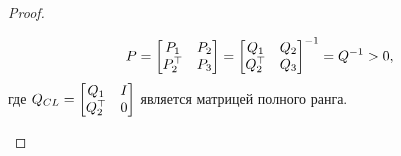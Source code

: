 \begin{proof}
\begin{lemma}
		\begin{align*}
			{P}=
			\begin{bmatrix} 
				{P}_{1} & {P}_{2}\\ 
				{P}_{2}^\top & {P}_{3} 
			\end{bmatrix} =
			\begin{bmatrix} 
				{Q}_{1} & {Q}_{2} \\ 
				{Q}_{2}^\top & {Q}_{3}
			\end{bmatrix}^{-1}={Q}^{-1}>0,
		\end{align*} 
		где ${Q}_{CL}=
		\begin{bmatrix} 
			{Q}_{1} & {I} \\ {Q}_{2}^\top & 0
		\end{bmatrix}$ является матрицей полного ранга.\\
		

\end{lemma}
\end{proof}
